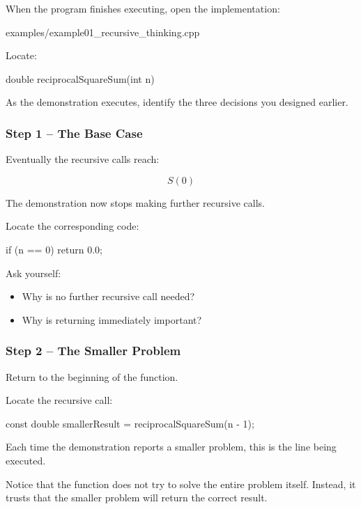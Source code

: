 \documentclass{csc2059practical}
\begin{document}
When the program finishes executing, open the implementation:

\begin{terminal}
examples/example01_recursive_thinking.cpp
\end{terminal}

Locate:

\begin{cppcode}
double reciprocalSquareSum(int n)
\end{cppcode}

As the demonstration executes, identify the three decisions you designed earlier.

\subsubsection*{Step 1 -- The Base Case}

Eventually the recursive calls reach:

\[
S(0)
\]

The demonstration now stops making further recursive calls.

Locate the corresponding code:

\begin{cppcode}
if (n == 0)
{
    return 0.0;
}
\end{cppcode}

Ask yourself:

\begin{itemize}
    \item Why is no further recursive call needed?
    \item Why is returning immediately important?
\end{itemize}

\subsubsection*{Step 2 -- The Smaller Problem}

Return to the beginning of the function.

Locate the recursive call:

\begin{cppcode}
const double smallerResult =
    reciprocalSquareSum(n - 1);
\end{cppcode}

Each time the demonstration reports a smaller problem, this is the line being
executed.

Notice that the function does not try to solve the entire problem itself.
Instead, it trusts that the smaller problem will return the correct result.
\end{document}
